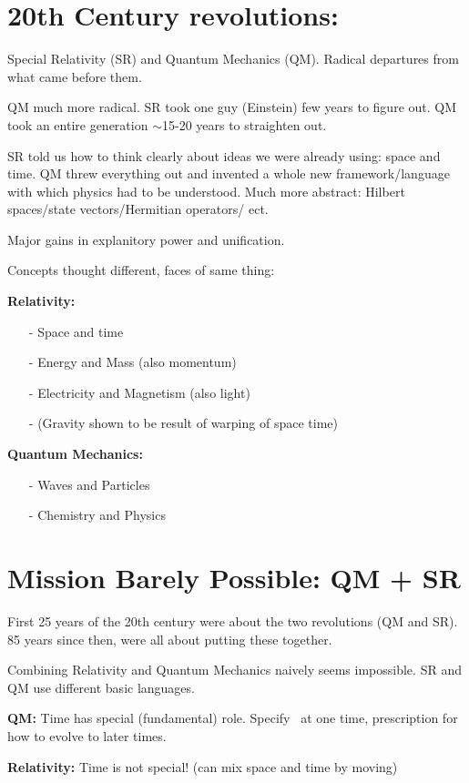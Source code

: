 \section{20th Century revolutions:}
Special Relativity (SR) and Quantum Mechanics (QM).
Radical departures from what came before them.

QM much more radical. 
SR took one guy (Einstein) few years to figure out. 
QM took an entire generation $\sim$15-20 years to straighten out. 

SR told us how to think clearly about ideas we were already using: space and time. 
QM threw everything out and invented a whole new framework/language with which physics had to be understood.
Much more abstract: Hilbert spaces/state vectors/Hermitian operators/ ect.

Major gains in explanitory power and unification.

Concepts thought different, faces of same thing:

\textbf{Relativity:}
\begin{itemize}
\item[-] Space and time
\item[-] Energy and Mass (also momentum)
\item[-] Electricity and Magnetism (also light)
\item[-] (Gravity shown to be result of warping of space time)
\end{itemize}

\textbf{Quantum Mechanics:}
\begin{itemize}
\item[-] Waves and Particles
\item[-] Chemistry and Physics
\end{itemize}

\section{Mission Barely Possible: QM + SR}
First 25 years of the 20th century were about the two revolutions (QM and SR).
85 years since then, were all about putting these together.

Combining Relativity and Quantum Mechanics naively seems impossible. 
SR and QM use different basic languages. 

\textbf{QM:} Time has special (fundamental) role. Specify \ketY\ at one time, prescription for how to evolve to later times.

\textbf{Relativity:} Time is not special! (can mix space and time by moving)

